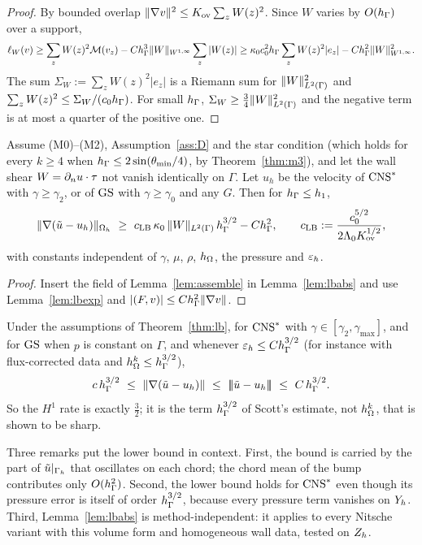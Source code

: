 \begin{proof}
By bounded overlap $\lVert \nabla v\rVert^2\le K_{\mathrm{ov}}\sum_zW(z)^2$. Since $W$ varies by $O(h_\Gamma)$ over a support,
\[
\ell_W(v)\ge\sum_zW(z)^2\mathcal M(v_z)-Ch_\Gamma^3\lVert W\rVert_{W^{1,\infty}}\sum_z|W(z)|\ge\kappa_0c_0^2h_\Gamma\sum_zW(z)^2|e_z|-Ch_\Gamma^2\lVert W\rVert^2_{W^{1,\infty}} .
\]
The sum $\Sigma_W:=\sum_zW(z)^2|e_z|$ is a Riemann sum for $\lVert W\rVert^2_{L^2(\Gamma)}$ and $\sum_zW(z)^2\le\Sigma_W/(c_0h_\Gamma)$. For small $h_\Gamma$, $\Sigma_W\ge\frac34\lVert W\rVert^2_{L^2(\Gamma)}$ and the negative term is at most a quarter of the positive one.
\end{proof}

\begin{theorem}\label{thm:lb}
Assume (M0)--(M2), Assumption~\ref{ass:D} and the star condition (which holds for every $k\ge4$ when $h_\Gamma\le2\sin(\theta_{\min}/4)$, by Theorem~\ref{thm:m3}), and let the wall shear $W=\partial_n u\cdot\tau$ not vanish identically on $\Gamma$. Let $u_h$ be the velocity of $\mathrm{CNS}^\ast$ with $\gamma\ge\gamma_2$, or of $\mathrm{GS}$ with $\gamma\ge\gamma_0$ and any $G$. Then for $h_\Gamma\le h_1$,
\[
\norm{\nabla(\ut-u_h)}_{\Oh}\ \ge\ c_{\mathrm{LB}}\,\kappa_0\,\norm{W}_{L^2(\Gamma)}\,\hG^{3/2}-C\hG^{2},\qquad c_{\mathrm{LB}}:=\frac{c_0^{5/2}}{2\Lambda_0K_{\mathrm{ov}}^{1/2}},
\]
with constants independent of $\gamma$, $\mu$, $\rho$, $h_\Omega$, the pressure and $\varepsilon_h$.
\end{theorem}

\begin{proof}
Insert the field of Lemma~\ref{lem:assemble} in Lemma~\ref{lem:lbabs} and use Lemma~\ref{lem:lbexp} and $|(F,v)|\le Ch_\Gamma^2\lVert \nabla v\rVert$.
\end{proof}

\begin{corollary}\label{cor:sharp}
Under the assumptions of Theorem~\ref{thm:lb}, for $\mathrm{CNS}^\ast$ with $\gamma\in[\gamma_2,\gamma_{\max}]$, and for $\mathrm{GS}$ when $p$ is constant on $\Gamma$, and whenever $\varepsilon_h\le Ch_\Gamma^{3/2}$ (for instance with flux-corrected data and $h_\Omega^k\le h_\Gamma^{3/2}$),
\[
c\,\hG^{3/2}\ \le\ \norm{\nabla(\ut-u_h)}\ \le\ \tnorm{\ut-u_h}\ \le\ C\,\hG^{3/2}.
\]
So the $H^1$ rate is exactly $\frac32$; it is the term $h_\Gamma^{3/2}$ of Scott's estimate, not $h_\Omega^k$, that is shown to be sharp.
\end{corollary}

Three remarks put the lower bound in context. First, the bound is carried by the part of $\tilde u|_{\Gamma_h}$ that oscillates on each chord; the chord mean of the bump contributes only $O(h_\Gamma^2)$. Second, the lower bound holds for $\mathrm{CNS}^\ast$ even though its pressure error is itself of order $h_\Gamma^{3/2}$, because every pressure term vanishes on $Y_h$. Third, Lemma~\ref{lem:lbabs} is method-independent: it applies to every Nitsche variant with this volume form and homogeneous wall data, tested on $Z_h$.

